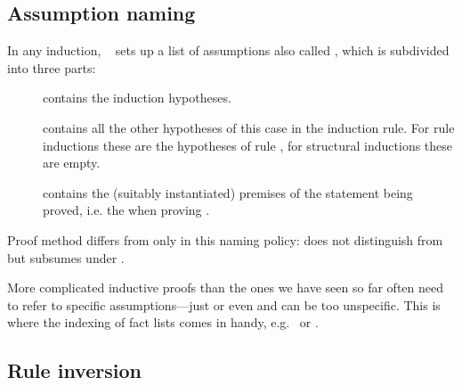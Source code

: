 \begin{isabellebody}
\begin{isamarkuptext}
\subsection{Assumption naming}

In any induction, ~ sets up a list of assumptions
also called , which is subdivided into three parts:
\begin{description}
\item[] contains the induction hypotheses.
\item[] contains all the other hypotheses of this case in the
induction rule. For rule inductions these are the hypotheses of rule
, for structural inductions these are empty.
\item[] contains the (suitably instantiated) premises
of the statement being proved, i.e. the  when
proving .
\end{description}
\begin{warn}
Proof method  differs from 
only in this naming policy:  does not distinguish
 from  but subsumes  under .
\end{warn}

More complicated inductive proofs than the ones we have seen so far
often need to refer to specific assumptions---just  or even
 and  can be too unspecific.
This is where the indexing of fact lists comes in handy, e.g.\
 or .

\subsection{Rule inversion}


\end{isamarkuptext}
\end{isabellebody}
